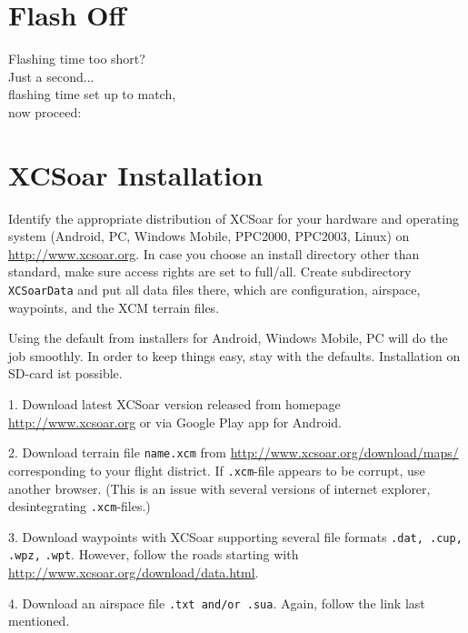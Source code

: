 \section*{{\color[rgb]{.9,.85,0}Flash} Off}

\hspace*{1cm} Flashing time too short?\\
\hspace*{4cm} Just a second...\\
\hspace*{6cm} flashing time set up to match,\\
\hspace*{10cm} now proceed:

\setlength{\parskip}{0.3\baselineskip}
\newpage
{}
\pagestyle{fancy}
\section{XCSoar Installation}\label{ch:XCSinstall}
Identify the appropriate distribution of XCSoar for your hardware and 
operating system \textsf{(Android, PC, Windows Mobile, PPC2000, PPC2003, Linux)} 
on \url{http://www.xcsoar.org}.
In case you choose an install directory other than standard, make sure access 
rights are set to full/all. Create subdirectory \verb+XCSoarData+ and put all 
data files there, which are configuration, airspace, waypoints, and the XCM 
terrain files.

Using the default from installers for Android, Windows Mobile, PC will do the 
job smoothly.  In order to keep things easy, stay with the defaults. 
Installation on SD-card ist possible.

\begin{compactitem}
\item[1.] Download latest XCSoar version released from homepage 
{\url{http://www.xcsoar.org}} or via Google Play app for Android.
\item[2.] Download terrain file \verb+name.xcm+ from 
{\url{http://www.xcsoar.org/download/maps/}}
corresponding to your flight district.  If \verb+.xcm+-file appears to be 
corrupt, use another browser. (This is an issue with several versions of 
internet explorer, desintegrating \verb+.xcm+-files.)
\item[3.] Download waypoints with XCSoar supporting several file formats 
\verb+.dat, .cup, .wpz,+ \verb+.wpt+.  However, follow the roads starting with 
{\url{http://www.xcsoar.org/download/data.html}}.
\item[4.] Download an airspace file \verb+.txt and/or .sua+.  Again, follow 
the link last mentioned.
\end{compactitem}

